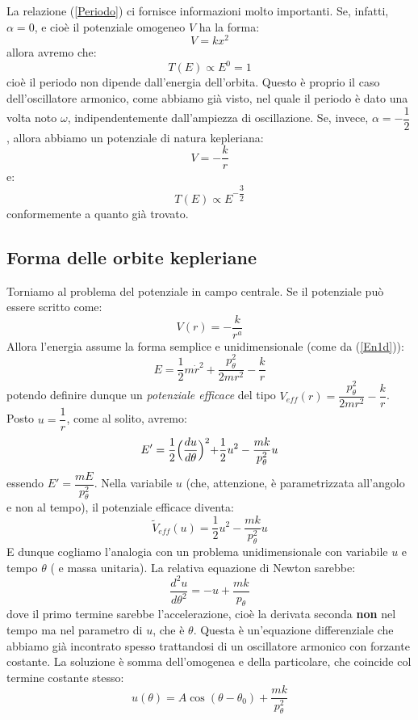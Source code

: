 \documentclass[a4paper,openany]{article}
\begin{document}
	La relazione (\ref{Periodo}) ci fornisce informazioni molto importanti. Se, infatti, $\alpha=0$, e cioè il potenziale omogeneo $V$ ha la forma:
	$$
	V = kx^2
	$$
	allora avremo che:
	$$
	T(E) \propto E^0 = 1
	$$
	cioè il periodo non dipende dall'energia dell'orbita. Questo è proprio il caso dell'oscillatore armonico, come abbiamo già visto, nel quale il periodo è dato una volta noto $\omega$, indipendentemente dall'ampiezza di oscillazione. Se, invece, $\alpha = -\dfrac{1}{2}$, allora abbiamo un potenziale di natura kepleriana:
	$$
	V = -\dfrac{k}{r}
	$$
	e:
	$$
	T(E) \propto E^{-\dfrac{3}{2}}
	$$
	conformemente a quanto già trovato.
	
	\subsection{Forma delle orbite kepleriane}
	Torniamo al problema del potenziale in campo centrale. Se il potenziale può essere scritto come:
	$$
	V(r) = -\dfrac{k}{r^{a}}
	$$
	Allora l'energia assume la forma semplice e unidimensionale (come da (\ref{En1d})):
	$$
	E = \dfrac{1}{2}m\dot{r}^{2} + \dfrac{p_{\theta}^{2}}{2mr^{2}} - \dfrac{k}{r}
	$$
	potendo definire dunque un \textit{potenziale efficace} del tipo $V_{eff}(r) =  \dfrac{p_{\theta}^{2}}{2mr^{2}} - \dfrac{k}{r}$. Posto $u = \dfrac{1}{r}$, come al solito, avremo:
	$$
	E' = \dfrac{1}{2}\Bigl(\dfrac{du}{d\theta}\Bigl)^{2} + \dfrac{1}{2}u^{2} - \dfrac{mk}{p_{\theta}^{2}}u
	$$
	essendo $E' = \dfrac{mE}{p_{\theta}^2}$. Nella variabile $u$ (che, attenzione, è parametrizzata all'angolo e non al tempo), il potenziale efficace diventa:
	$$
	\tilde{V}_{eff}(u) = \dfrac{1}{2}u^2-\dfrac{mk}{p_{\theta}^2}u
	$$
	E dunque cogliamo l'analogia con un problema unidimensionale con variabile $u$ e tempo $\theta$ ( e massa unitaria). La relativa equazione di Newton sarebbe:
	\begin{equation}\label{key}
		\dfrac{d^2u}{d\theta^2} = -u+\dfrac{mk}{p_{\theta}}
	\end{equation}
	dove il primo termine sarebbe l'accelerazione, cioè la derivata seconda \textbf{non} nel tempo ma nel parametro di $u$, che è $\theta$. Questa è un'equazione differenziale che abbiamo già incontrato spesso trattandosi di un oscillatore armonico con forzante costante.  La soluzione è somma dell'omogenea e della particolare, che coincide col termine costante stesso:
	\begin{equation}\label{key}
		u(\theta) = A\cos(\theta-\theta_0)+\dfrac{mk}{p_{\theta}^2}
	\end{equation}
\end{document}
